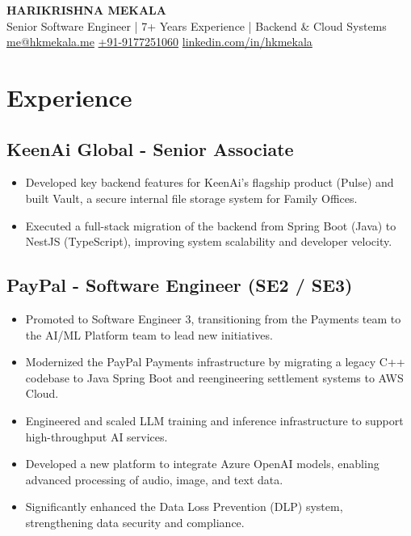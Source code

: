 \documentclass[11pt]{article}
\begin{document}
\begin{center}
    {\Huge\bfseries\uppercase{Harikrishna Mekala}} \\ \medskip
    {\large Senior Software Engineer | 7+ Years Experience | Backend & Cloud Systems} \\ \medskip
    \href{mailto:me@hkmekala.me}{me@hkmekala.me} \quad
    \href{tel:+919177251060}{+91-9177251060} \quad
    \href{https://www.linkedin.com/in/hkmekala}{linkedin.com/in/hkmekala}
\end{center}

\section{Experience}
\subsection{\textbf{KeenAi Global} - Senior Associate  }
\begin{itemize}[nosep, leftmargin=*]
    \item Developed key backend features for KeenAi's flagship product (Pulse) and built Vault, a secure internal file storage system for Family Offices.
    \item Executed a full-stack migration of the backend from Spring Boot (Java) to NestJS (TypeScript), improving system scalability and developer velocity.
\end{itemize}

\subsection{\textbf{PayPal} - Software Engineer (SE2 / SE3)  }
\begin{itemize}[nosep, leftmargin=*]
    \item Promoted to Software Engineer 3, transitioning from the Payments team to the AI/ML Platform team to lead new initiatives.
    \item Modernized the PayPal Payments infrastructure by migrating a legacy C++ codebase to Java Spring Boot and reengineering settlement systems to AWS Cloud.
    \item Engineered and scaled LLM training and inference infrastructure to support high-throughput AI services.
    \item Developed a new platform to integrate Azure OpenAI models, enabling advanced processing of audio, image, and text data.
    \item Significantly enhanced the Data Loss Prevention (DLP) system, strengthening data security and compliance.
\end{itemize}
\end{document}
